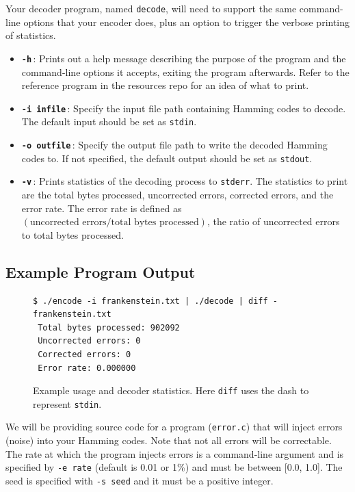 \documentclass[11pt]{article}
\begin{document}
Your decoder program, named \texttt{decode}, will need to support the
same command-line options that your encoder does, plus an option to
trigger the verbose printing of statistics.

\begin{itemize}
  \item \textbf{\texttt{-h}}\,: Prints out a help message describing the purpose
    of the program and the command-line options it accepts, exiting the
    program afterwards. Refer to the reference program in the resources
    repo for an idea of what to print.
  \item \textbf{\texttt{-i infile}}\,: Specify the input file path
    containing Hamming codes to decode. The default input
    should be set as \texttt{stdin}.
  \item \textbf{\texttt{-o outfile}}\,: Specify the output file path to
    write the decoded Hamming codes to. If not specified, the default
    output should be set as \texttt{stdout}.
  \item \textbf{\texttt{-v}}\,: Prints statistics of the decoding
    process to \texttt{stderr}. The statistics to print are the total
    bytes processed, uncorrected errors, corrected errors, and the error
    rate. The error rate is defined as $(\text{uncorrected errors} /
    \text{total bytes processed})$, the ratio of uncorrected errors to
    total bytes processed.
\end{itemize}

\subsection{Example Program Output}

\begin{figure}[ht]
\begin{centering}
  \begin{lstlisting}[style=bashstyle]
 $ ./encode -i frankenstein.txt | ./decode | diff - frankenstein.txt
 Total bytes processed: 902092
 Uncorrected errors: 0
 Corrected errors: 0
 Error rate: 0.000000\end{lstlisting}
  \caption{Example usage and decoder statistics. Here \texttt{diff} uses the dash
  to represent \texttt{stdin}. }
\end{centering}
\end{figure}

We will be providing source code for a program (\texttt{error.c}) that
will inject errors (noise) into your Hamming codes. Note that not all
errors will be correctable. The rate at which the program injects errors
is a command-line argument and is specified by \texttt{-e rate} (default
is 0.01 or 1\%) and must be between [0.0, 1.0]. The seed is specified
with \texttt{-s seed} and it must be a positive integer.
\end{document}
